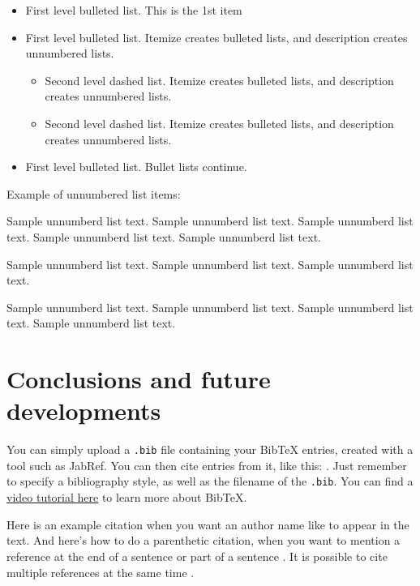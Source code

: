 \documentclass[12pt,a4paper]{article}
\newenvironment{unlist}{%
  \begin{list}{}{%
    \setlength{\labelwidth}{0pt}%
    \setlength{\labelsep}{0pt}%
    \setlength{\leftmargin}{2em}%
    \setlength{\itemindent}{-2em}%
    \setlength{\topsep}{\medskipamount}%
    \setlength{\itemsep}{3pt}%
  }%
}{%
  \end{list}%
}
\begin{document}
\begin{itemize}
\item First level bulleted list. This is the 1st item
\item First level bulleted list. Itemize creates bulleted lists, and description creates unnumbered lists.

\begin{itemize}
\item Second level dashed list. Itemize creates bulleted lists, and description creates unnumbered lists.
\item Second level dashed list. Itemize creates bulleted lists, and description creates unnumbered lists.
\end{itemize}

\item First level bulleted list. Bullet lists continue.
\end{itemize}

\noindent
Example of unnumbered list items:

\begin{unlist}
\item Sample unnumberd list text. Sample unnumberd list text. Sample unnumberd list text. Sample unnumberd list text. Sample unnumberd list text.

\item Sample unnumberd list text. Sample unnumberd list text. Sample unnumberd list text.

\item Sample unnumberd list text. Sample unnumberd list text. Sample unnumberd list text. Sample unnumberd list text. 
\end{unlist}


\section{Conclusions and future developments}

You can simply upload a \verb|.bib| file containing your BibTeX entries, created with a tool such as JabRef. You can then cite entries from it, like this: \textcite{greenwade93}. Just remember to specify a bibliography style, as well as the filename of the \verb|.bib|. You can find a \href{https://www.overleaf.com/help/97-how-to-include-a-bibliography-using-bibtex}{video tutorial here} to learn more about BibTeX.

Here is an example citation when you want an author name like \textcite{collins2011a} to appear in the text. And here's how to do a parenthetic citation, when you want to mention a reference at the end of a sentence or part of a sentence \parencite{collins2013}. It is possible to cite multiple references at the same time \parencite{collins2011b,collins2016,lunn2007a,lunn2007b,ross2006,shannon1948}.
\end{document}
